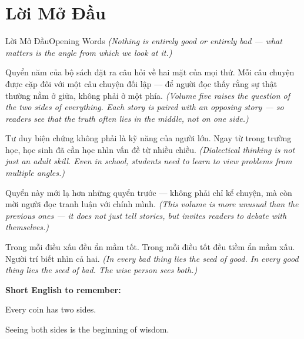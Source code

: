 \chapter*{Lời Mở Đầu}

\begin{truyen}{Lời Mở Đầu}{Opening Words}
\textit{(Nothing is entirely good or entirely bad --- what matters is the angle from which we look at it.)}

Quyển năm của bộ sách đặt ra câu hỏi về hai mặt của mọi thứ. Mỗi câu chuyện được cặp đôi với một câu chuyện đối lập — để người đọc thấy rằng sự thật thường nằm ở giữa, không phải ở một phía.
\textit{(Volume five raises the question of the two sides of everything. Each story is paired with an opposing story --- so readers see that the truth often lies in the middle, not on one side.)}

Tư duy biện chứng không phải là kỹ năng của người lớn. Ngay từ trong trường học, học sinh đã cần học nhìn vấn đề từ nhiều chiều.
\textit{(Dialectical thinking is not just an adult skill. Even in school, students need to learn to view problems from multiple angles.)}

Quyển này mới lạ hơn những quyển trước — không phải chỉ kể chuyện, mà còn mời người đọc tranh luận với chính mình.
\textit{(This volume is more unusual than the previous ones --- it does not just tell stories, but invites readers to debate with themselves.)}
\end{truyen}

\begin{baihoc}
Trong mỗi điều xấu đều ẩn mầm tốt. Trong mỗi điều tốt đều tiềm ẩn mầm xấu. Người trí biết nhìn cả hai.
\textit{(In every bad thing lies the seed of good. In every good thing lies the seed of bad. The wise person sees both.)}
\end{baihoc}

\begin{tcolorbox}[colback=truyenblue!6,colframe=truyenblue,coltitle=white,fonttitle=\bfseries,title={Easy English},arc=4pt,boxrule=1pt,breakable]
\textbf{Short English to remember:}

Every coin has two sides.

Seeing both sides is the beginning of wisdom.
\end{tcolorbox}

